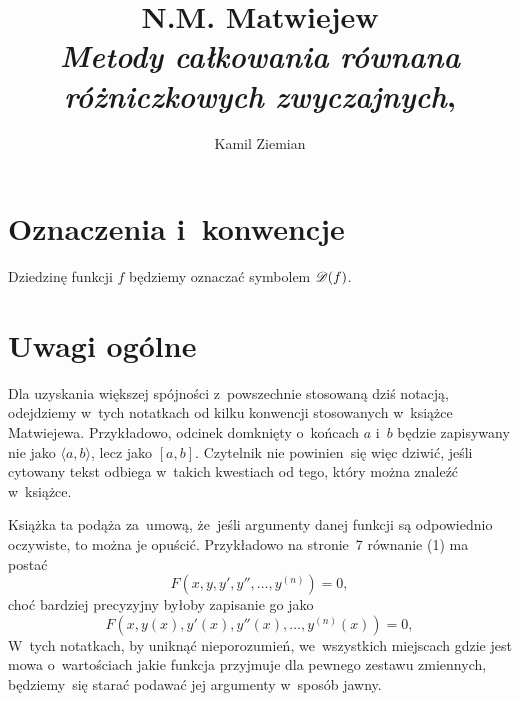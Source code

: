 \documentclass[a4paper,11pt]{article}
\title{N.M. Matwiejew \\
  \textit{Metody całkowania równana różniczkowych zwyczajnych},
  \cite{MatwiejewMetodyCalkowaniaRownanRozniczkowychZwyczajnych1986}}
\author{Kamil Ziemian}
\numberwithin{equation}{section}
\begin{document}





\maketitle










\section{Oznaczenia i~konwencje}

\label{sec:Oznaczenia-i-konwencje}



\noindent
Dziedzinę funkcji $f$ będziemy oznaczać symbolem $\mathcal{D}( f )$.

\VerSpaceFour










\section{Uwagi ogólne}

\label{sec:Uwagi-ogolne}



\noindent
Dla uzyskania większej spójności z~powszechnie stosowaną dziś notacją,
odejdziemy w~tych notatkach od kilku konwencji stosowanych w~książce
Matwiejewa. Przykładowo, odcinek domknięty o~końcach $a$ i~$b$ będzie
zapisywany nie jako $\langle a, b \rangle$, lecz jako $[ a, b ]$. Czytelnik nie
powinien~się więc dziwić, jeśli cytowany tekst odbiega w~takich kwestiach
od tego, który można znaleźć w~książce.

\VerSpaceFour





\noindent
Książka ta podąża za~umową, że~jeśli argumenty danej funkcji są
odpowiednio oczywiste, to można je opuścić. Przykładowo na stronie~7
równanie (1) ma postać
\begin{equation}
  \label{eq:Uwagi-ogolne-01}
  F\left( x, y, y', y'', \ldots, y^{ ( n ) } \right) = 0,
\end{equation}
choć bardziej precyzyjny byłoby zapisanie go jako
\begin{equation}
  \label{eq:Uwagi-ogolne-02}
  F\left( x, y( x ), y'( x ), y''( x ), \ldots, y^{ ( n ) }( x ) \right) = 0,
\end{equation}
W~tych notatkach, by uniknąć nieporozumień, we~wszystkich miejscach gdzie
jest mowa o~wartościach jakie funkcja przyjmuje dla pewnego zestawu
zmiennych, będziemy~się starać podawać jej argumenty w~sposób jawny.
\end{document}
